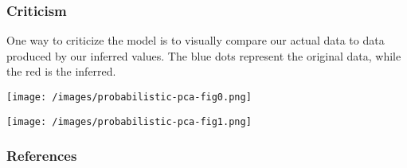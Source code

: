 \subsubsection{Criticism}

One way to criticize the model is to visually compare our actual data
to data produced by our inferred values. The blue dots represent the
original data, while the red is the inferred.

\texttt{[image: /images/probabilistic-pca-fig0.png]}

\texttt{[image: /images/probabilistic-pca-fig1.png]}

\subsubsection{References}\label{references}
